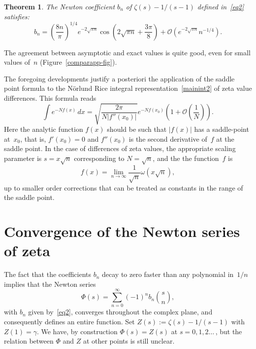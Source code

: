 \documentclass{amsart}
\newtheorem{theorem}{Theorem}
\begin{document}
\begin{theorem} \label{zetacoeff-thm}
The Newton coefficient $b_n$ of $\zeta(s)-1/(s-1)$ defined in~\eqref{eq2}
satisfies:
\begin{equation}\label{thmz}
b_n = \left( \frac{8n}{\pi}\right)^{1/4}
e^{-2\sqrt{\pi n}}\cos\left(2\sqrt{\pi n}+\frac{3\pi}{8}\right)
+\mathcal{O}\left(e^{-2\sqrt{\pi n}}n^{-1/4}\right).
\end{equation}
\end{theorem}

The agreement between asymptotic and exact values is quite good,
even for small values of~$n$ (Figure~\ref{comparapp-fig}).

\smallskip

The foregoing developments justify a posteriori the application of the saddle point formula to the N\"orlund Rice
integral representation~\eqref{mainint2} of zeta value differences. This formula
reads
\begin{equation}\label{sadfor}
\int e^{-Nf(x)} \, dx =\sqrt{\frac{2\pi}{N|f''(x_0)|}}
e^{-N f(x_0)}\left(1+\mathcal{O}\left(\frac{1}{N}\right)\right).
\end{equation}
Here the analytic function $f(x)$ should be such that $|f(x)|$ has a saddle-point at~$x_0$,
that is, $f'(x_0)=0$ and $f''(x_0)$ is the second derivative of~$f$ at the saddle point.
In the case of differences of zeta values, 
the appropriate scaling parameter is $s=x\sqrt{n}$ corresponding to $N=\sqrt{n}$, and the
the function~$f$ is
\[
f(x)=\lim_{n\to\infty} \frac{1}{\sqrt{n}}\omega\left(x\sqrt{n}\right),
\]
up to smaller order corrections that can be treated as constants in the range of the saddle point.

\section{Convergence of the Newton series of zeta}

The fact that the coefficients $b_n$ decay to zero faster than any polynomial in~$1/n$ 
implies that the Newton series
\begin{equation}\label{newtonz}
\Phi(s)=\sum_{n=0}^\infty (-1)^n b_n \binom{s}{n},
\end{equation}
with $b_n$ given by~\eqref{eq2},
converges throughout the complex plane, and consequently defines an entire function.
Set $Z(s):=\zeta(s)-1/(s-1)$ with~$Z(1)=\gamma$. We have, by construction $\Phi(s)=Z(s)$
at $s=0,1,2\ldots\,$, but the relation between $\Phi$ and $Z$ at other points is still unclear.
\end{document}
